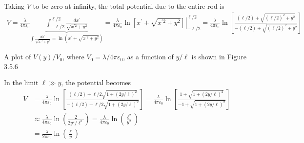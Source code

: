 \documentclass[12pt]{article}
\begin{document}
Taking \(V\) to be zero at infinity, the total potential due to the entire rod is
\[
\begin{aligned}
V =\frac{\lambda}{4 \pi \varepsilon_0} \underbrace{\int_{-\ell / 2}^{\ell / 2} \frac{d x^{\prime}}{\sqrt{x^{\prime 2}+y^2}}}_{\int \frac{d x^{\prime}}{\sqrt{x^{\prime 2}+y^2}}=\ln \left(x^{\prime}+\sqrt{x^{\prime 2}+y^2}\right)}=\left.\frac{\lambda}{4 \pi \varepsilon_0} \ln \left[x^{\prime}+\sqrt{x^{\prime 2}+y^2}\right]\right|_{-\ell / 2} ^{\ell / 2} =\frac{\lambda}{4 \pi \varepsilon_0} \ln \left[\frac{(\ell / 2)+\sqrt{(\ell / 2)^2+y^2}}{-(\ell / 2)+\sqrt{(\ell / 2)^2+y^2}}\right]
\end{aligned}
\]

A plot of \(V(y) / V_0\), where \(V_0=\lambda / 4 \pi \varepsilon_0\), as a function of \(y / \ell\) is shown in Figure 3.5.6

\begin{figure}[ht!]
\centering
{}
\end{figure}

In the limit \(\ell \gg y\), the potential becomes
\[
\begin{aligned}
V & =\frac{\lambda}{4 \pi \varepsilon_0} \ln \left[\frac{(\ell / 2)+\ell / 2 \sqrt{1+(2 y / \ell)^2}}{-(\ell / 2)+\ell / 2 \sqrt{1+(2 y / \ell)^2}}\right]=\frac{\lambda}{4 \pi \varepsilon_0} \ln \left[\frac{1+\sqrt{1+(2 y / \ell)^2}}{-1+\sqrt{1+(2 y / \ell)^2}}\right] \\
& \approx \frac{\lambda}{4 \pi \varepsilon_0} \ln \left(\frac{2}{2 y^2 / \ell^2}\right)=\frac{\lambda}{4 \pi \varepsilon_0} \ln \left(\frac{\ell^2}{y^2}\right) \\
& =\frac{\lambda}{2 \pi \varepsilon_0} \ln \left(\frac{\ell}{y}\right)
\end{aligned}
\]
\end{document}
